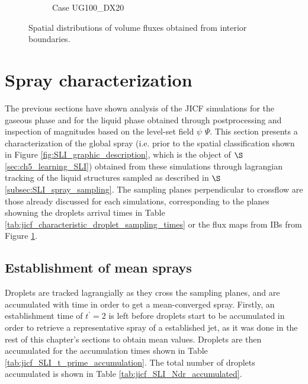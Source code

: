 \begin{figure}[ht]
\begin{subfigure}[b]{1.1\textwidth}
   \vspace*{-0.1in}
	\caption{Case UG100\_DX20}
\end{subfigure}


   \caption{Spatial distributions of volume fluxes obtained from interior boundaries.}
\label{fig:ibs_spatial_distributions}
\end{figure}


\clearpage

\section{Spray characterization}
\label{sec:ch5_sec_spray_characterization}


The previous sections have shown analysis of the JICF simulations for the gaseous phase and for the liquid phase obtained through postprocessing and inspection of magnitudes based on the level-set field $\psi$ $\Psi$. This section presents a characterization of the global spray (i.e. prior to the spatial classification shown in Figure \ref{fig:SLI_graphic_description}, which is the object of $\S$\ref{sec:ch5_learning_SLI}) obtained from these simulations through lagrangian tracking of the liquid structures sampled as described in $\S$\ref{subsec:SLI_spray_sampling}. The sampling planes perpendicular to crossflow are those already discussed for each simulations, corresponding to the planes showning the droplets arrival times in Table \ref{tab:jicf_characteristic_droplet_sampling_times} or the flux maps from IBs from Figure \ref{fig:ibs_spatial_distributions}.

\subsection{Establishment of mean sprays}

Droplets are tracked lagrangially as they cross the sampling planes, and are accumulated with time in order to get a mean-converged spray. Firstly, an establishment time of $t^{\prime} = 2$ is left before droplets start to be accumulated in order to retrieve a representative spray of a established jet, as it was done in the rest of this chapter's sections to obtain mean values. Droplets are then accumulated for the accumulation times shown in Table \ref{tab:jicf_SLI_t_prime_accumulation}. The total number of droplets accumulated is shown in Table \ref{tab:jicf_SLI_Ndr_accumulated}.

